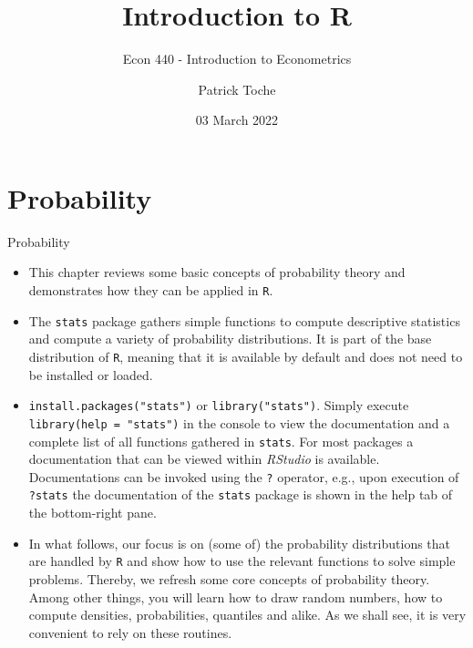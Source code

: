 \documentclass[
  11pt,
  ignorenonframetext,
  svgnames, handout]{beamer}
\title{Introduction to R}
\subtitle{Econ 440 - Introduction to Econometrics}
\author{Patrick Toche}
\date{03 March 2022}
\begin{document}
\frame{\titlepage}

\hypertarget{probability}{%
\section{Probability}\label{probability}}

\begin{frame}[fragile]{Probability}
\begin{itemize}
\item
  This chapter reviews some basic concepts of probability theory and
  demonstrates how they can be applied in \texttt{R}.
\item
  The \texttt{stats} package gathers simple functions to compute
  descriptive statistics and compute a variety of probability
  distributions. It is part of the base distribution of \texttt{R},
  meaning that it is available by default and does not need to be
  installed or loaded.
\item
  \texttt{install.packages("stats")} or \texttt{library("stats")}.
  Simply execute \texttt{library(help\ =\ "stats")} in the console to
  view the documentation and a complete list of all functions gathered
  in \texttt{stats}. For most packages a documentation that can be
  viewed within \emph{RStudio} is available. Documentations can be
  invoked using the \texttt{?} operator, e.g., upon execution of
  \texttt{?stats} the documentation of the \texttt{stats} package is
  shown in the help tab of the bottom-right pane.
\item
  In what follows, our focus is on (some of) the probability
  distributions that are handled by \texttt{R} and show how to use the
  relevant functions to solve simple problems. Thereby, we refresh some
  core concepts of probability theory. Among other things, you will
  learn how to draw random numbers, how to compute densities,
  probabilities, quantiles and alike. As we shall see, it is very
  convenient to rely on these routines.
\end{itemize}
\end{frame}
\end{document}
